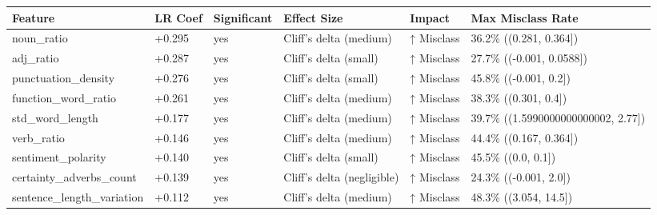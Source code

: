 \begin{tabular}{llllll}
\toprule
Feature & LR Coef & Significant & Effect Size & Impact & Max Misclass Rate \\
\midrule
noun\_ratio & +0.295 & yes & Cliff's delta (medium) & ↑ Misclass & 36.2\% ((0.281, 0.364]) \\
adj\_ratio & +0.287 & yes & Cliff's delta (small) & ↑ Misclass & 27.7\% ((-0.001, 0.0588]) \\
punctuation\_density & +0.276 & yes & Cliff's delta (small) & ↑ Misclass & 45.8\% ((-0.001, 0.2]) \\
function\_word\_ratio & +0.261 & yes & Cliff's delta (medium) & ↑ Misclass & 38.3\% ((0.301, 0.4]) \\
std\_word\_length & +0.177 & yes & Cliff's delta (medium) & ↑ Misclass & 39.7\% ((1.5990000000000002, 2.77]) \\
verb\_ratio & +0.146 & yes & Cliff's delta (medium) & ↑ Misclass & 44.4\% ((0.167, 0.364]) \\
sentiment\_polarity & +0.140 & yes & Cliff's delta (small) & ↑ Misclass & 45.5\% ((0.0, 0.1]) \\
certainty\_adverbs\_count & +0.139 & yes & Cliff's delta (negligible) & ↑ Misclass & 24.3\% ((-0.001, 2.0]) \\
sentence\_length\_variation & +0.112 & yes & Cliff's delta (medium) & ↑ Misclass & 48.3\% ((3.054, 14.5]) \\
\bottomrule
\end{tabular}
